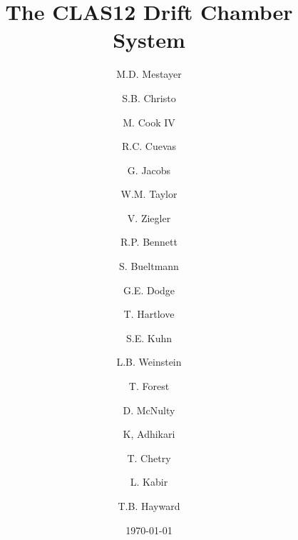 \documentclass{elsart}
\begin{document}
\begin{frontmatter}
  
\title{The CLAS12 Drift Chamber System}


\author[jlab]{M.D. Mestayer}
\author[jlab]{S.B. Christo}
\author[jlab]{M. Cook IV}
\author[jlab]{R.C. Cuevas}
\author[jlab]{G. Jacobs}
\author[Jlab]{W.M. Taylor}
\author[jlab]{V. Ziegler}
\author[odu]{R.P. Bennett}
\author[odu]{S. Bueltmann}
\author[odu]{G.E. Dodge}
\author[odu]{T. Hartlove}
\author[odu]{S.E. Kuhn}
\author[odu]{L.B. Weinstein}
\author[isu]{T. Forest}
\author[isu]{D. McNulty}
\author[msu]{K, Adhikari}
\author[msu]{T. Chetry}
\author[msu]{L. Kabir}
\author[wm]{T.B. Hayward}
\address[jlab]{Thomas Jefferson National Accelerator Facility, Newport News, VA 23606, USA}
\address[odu]{Old Dominion University}
\address[isu]{Idaho State University}
\address[msu]{Mississippi State University}
\address[wm]{University of William and Mary}

\date{\today}





\end{frontmatter}













\end{document}
